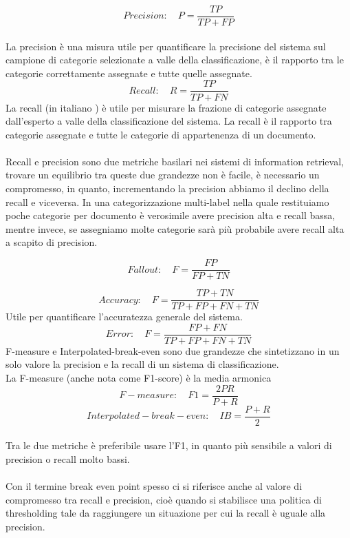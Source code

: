\documentclass{article}
\theoremstyle{plain}
\theoremstyle{definition}
\begin{document}
\[ Precision: \quad P= \frac{TP}{TP+FP} \]
\\
La precision è una misura utile per quantificare la precisione del sistema sul campione di categorie selezionate a valle della classificazione, è il rapporto tra le categorie correttamente assegnate e tutte quelle assegnate.
\[ Recall: \quad R= \frac{TP}{TP+FN} \]
La recall (in italiano ) è utile per misurare la frazione di categorie assegnate dall'esperto a valle della classificazione del sistema. La recall è il rapporto tra categorie assegnate e tutte le categorie di appartenenza di un documento. 
\\
\\
Recall e precision sono due metriche basilari nei sistemi di information retrieval, trovare un equilibrio tra queste due grandezze non è facile, è necessario un compromesso, in quanto, incrementando la precision abbiamo il declino della recall e viceversa. In una categorizzazione multi-label nella quale restituiamo poche categorie per documento è verosimile avere precision alta e recall bassa, mentre invece, se assegniamo molte categorie sarà più probabile avere recall alta a scapito di precision.


\[ Fallout: \quad F= \frac{FP}{FP+TN} \]

\[ Accuracy: \quad F= \frac{TP+TN}{TP+FP+FN+TN} \]
Utile per quantificare l'accuratezza generale del sistema.
\[ Error: \quad F= \frac{FP+FN}{TP+FP+FN+TN} \]
F-measure e Interpolated-break-even sono due grandezze che sintetizzano in un solo valore la precision e la recall di un sistema di classificazione.
\\
La F-measure (anche nota come F1-score) è la media armonica 
\[ F-measure: \quad F1= \frac{2PR}{P+R} \]
\[ Interpolated-break-even: \quad IB= \frac{P+R}{2} \]
\\
Tra le due metriche è preferibile usare l'F1, in quanto più sensibile a valori di precision o recall molto bassi.
\\
\\
Con il termine break even point spesso ci si riferisce anche al valore di compromesso tra recall e precision, cioè quando si stabilisce una politica di thresholding tale da raggiungere un situazione per cui la recall è uguale alla precision. 
\end{document}
